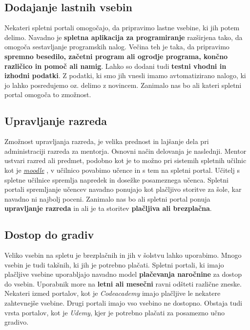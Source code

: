 \subsection{Dodajanje lastnih vsebin}
\label{sec:dodajanje_vsebin}

Nekateri spletni portali omogočajo, da pripravimo lastne vsebine, ki
jih potem delimo. Navadno je \textbf{spletna aplikacija za
  programiranje} razširjena tako, da omogoča sestavljanje programskih
nalog. Večina teh je taka, da pripravimo \textbf{spremno besedilo,
  začetni program ali ogrodje programa, končno različico in pomoč ali
  namig}. Lahko so dodani tudi \textbf{testni vhodni in izhodni
  podatki}. Z podatki, ki smo jih vnesli imamo avtomatizirano nalogo,
ki jo lahko posredujemo oz. delimo z novincem. Zanimalo nas bo ali
kateri spletni portal omogoča to zmožnost.

\subsection{Upravljanje razreda}
\label{sec:upravljanje_razreda}

Zmožnost upravljanja razreda, je velika prednost in lajšanje dela pri
administraciji razreda za mentorja. Osnovni način delovanja je
naslednji. Mentor ustvari razred ali predmet, podobno kot je to možno
pri sistemih spletnih učilnic kot je
\emph{\href{https://moodle.org/}{moodle}} \cite{web:moodle_site}, v
učilnico povabimo učence in s tem na spletni portal. Učitelj s spletne
učilnice spremlja napredek in dosežke posameznega učenca. Spletni
portali spremljanje učencev navadno ponujajo kot plačljivo storitve za
šole, kar navadno ni najbolj poceni. Zanimalo nas bo ali spletni
portal ponuja \textbf{upravljanje razreda} in ali je ta storitev
\textbf{plačljiva ali brezplačna}.

\subsection{Dostop do gradiv}
\label{sec:dostop_do_gradiv}

Veliko vsebin na spletu je brezplačnih in jih v šolstvu lahko
uporabimo. Mnogo vsebin je tudi takšnih, ki jih je potrebno
plačati. Spletni portali, ki imajo plačljive vsebine uporabljajo
navadno model \textbf{plačevanja naročnine} za dostop do
vsebin. Uporabnik more na \textbf{letni ali mesečni} ravni odšteti
različne zneske. Nekateri izmed portalov, kot je \emph{Codeacademy}
imajo plačljive le nekatere zahtevnejše vsebine. Drugi portali imajo
vso vsebino ne dostopno. Obstaja tudi vrsta portalov, kot je
\emph{Udemy}, kjer je potrebno plačati za posamezno učno gradivo.


